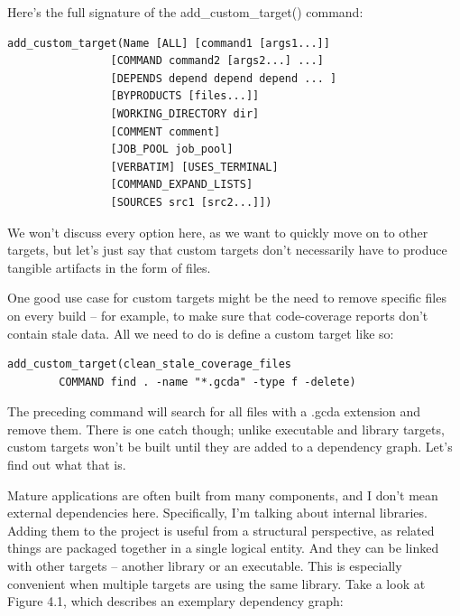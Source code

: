 Here's the full signature of the add\_custom\_target() command:

\begin{lstlisting}[style=styleCMake]
add_custom_target(Name [ALL] [command1 [args1...]]
				[COMMAND command2 [args2...] ...]
				[DEPENDS depend depend depend ... ]
				[BYPRODUCTS [files...]]
				[WORKING_DIRECTORY dir]
				[COMMENT comment]
				[JOB_POOL job_pool]
				[VERBATIM] [USES_TERMINAL]
				[COMMAND_EXPAND_LISTS]
				[SOURCES src1 [src2...]])
\end{lstlisting}

We won't discuss every option here, as we want to quickly move on to other targets, but let's just say that custom targets don't necessarily have to produce tangible artifacts in the form of files.

One good use case for custom targets might be the need to remove specific files on every build – for example, to make sure that code-coverage reports don't contain stale data. All we need to do is define a custom target like so:

\begin{lstlisting}[style=styleCMake]
add_custom_target(clean_stale_coverage_files
		COMMAND find . -name "*.gcda" -type f -delete)
\end{lstlisting}

The preceding command will search for all files with a .gcda extension and remove them. There is one catch though; unlike executable and library targets, custom targets won't be built until they are added to a dependency graph. Let's find out what that is.


Mature applications are often built from many components, and I don't mean external dependencies here. Specifically, I'm talking about internal libraries. Adding them to the project is useful from a structural perspective, as related things are packaged together in a single logical entity. And they can be linked with other targets – another library or an executable. This is especially convenient when multiple targets are using the same library. Take a look at Figure 4.1, which describes an exemplary dependency graph:

